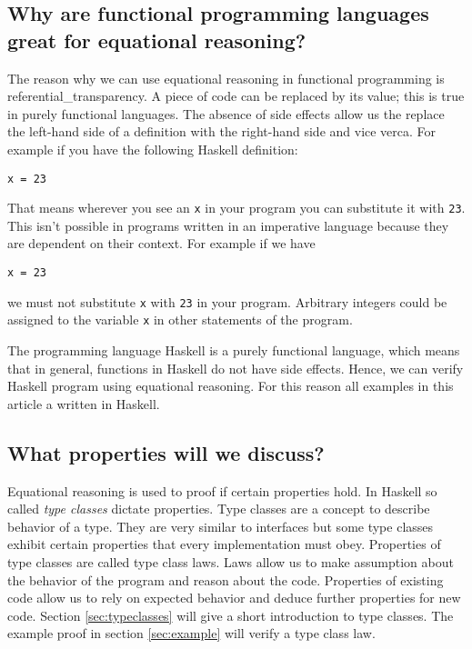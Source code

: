 \subsection{Why are functional programming languages great for equational reasoning?}

The reason why we can use equational reasoning in functional programming is \gls{referential_transparency}. A piece of code can be replaced by its value; this is true in purely functional languages. The absence of side effects allow us the replace the left-hand side of a definition with the right-hand side and vice verca. For example if you have the following Haskell definition:
\begin{verbatim}
x = 23
\end{verbatim}
That means wherever you see an \verb|x| in your program you can substitute it with \verb|23|.
This isn't possible in programs written in an imperative language because they are dependent on their context. For example if we have
\begin{verbatim}
x = 23
\end{verbatim}
we must not substitute \verb|x| with \verb|23| in your program. Arbitrary integers could be assigned to the variable \verb|x| in other statements of the program.

The programming language Haskell is a purely functional language, which means that in general, functions in Haskell do not have side effects. Hence, we can verify Haskell program using equational reasoning. For this reason all examples in this article a written in Haskell.

\subsection{What properties will we discuss?}

Equational reasoning is used to proof if certain properties hold. In Haskell so called \emph{type classes} dictate properties. Type classes are a concept to describe behavior of a type. They are very similar to interfaces but some type classes exhibit certain properties that every implementation must obey. Properties of type classes are called type class laws. Laws allow us to make assumption about the behavior of the program and reason about the code. Properties of existing code allow us to rely on expected behavior and deduce further properties for new code. Section \ref{sec:typeclasses} will give a short introduction to type classes. The example proof in section \ref{sec:example} will verify a type class law.

